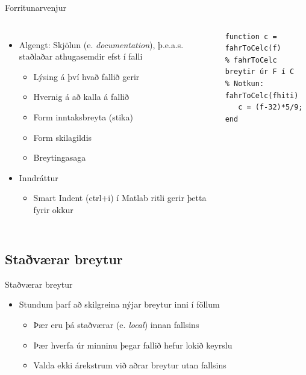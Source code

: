 \documentclass{beamer}
\begin{document}
\begin{frame}[fragile]{Forritunarvenjur}
\begin{columns}
\begin{itemize}
 \item Algengt: Skjölun (e. \emph{documentation}), þ.e.a.s. staðlaðar athugasemdir efst í falli
 \begin{itemize}
  \item Lýsing á því hvað fallið gerir
  \item Hvernig á að kalla á fallið
  \item Form inntaksbreyta (stika)
  \item Form skilagildis
  \item Breytingasaga
 \end{itemize}
 \item Inndráttur
 \begin{itemize}
  \item Smart Indent (ctrl+i) í Matlab ritli gerir þetta fyrir okkur
 \end{itemize}
\end{itemize}
\begin{verbatim}
function c = fahrToCelc(f)
% fahrToCelc breytir úr F í C
% Notkun:  fahrToCelc(fhiti)
   c = (f-32)*5/9;
end
\end{verbatim}

\end{columns}
\end{frame}

\subsection{Staðværar breytur}

\begin{frame}{Staðværar breytur}
\begin{itemize}
 \item Stundum þarf að skilgreina nýjar breytur inni í föllum
 \begin{itemize}
  \item Þær eru þá staðværar (e. \emph{local}) innan fallsins
  \item Þær hverfa úr minninu þegar fallið hefur lokið keyrslu
  \item Valda ekki árekstrum við aðrar breytur utan fallsins
 \end{itemize}
\end{itemize}
\end{frame}
\end{document}
